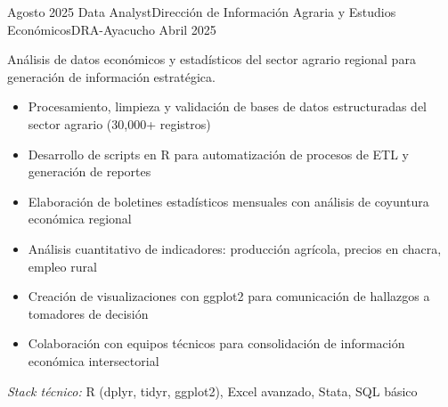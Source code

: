 \experience
{Agosto 2025} {Data Analyst}{Dirección de Información Agraria y Estudios Económicos}{DRA-Ayacucho}
{Abril 2025} {
	Análisis de datos económicos y estadísticos del sector agrario regional para generación de información estratégica.
	\begin{itemize}
		\item Procesamiento, limpieza y validación de bases de datos estructuradas del sector agrario (30,000+ registros)
		\item Desarrollo de scripts en R para automatización de procesos de ETL y generación de reportes
		\item Elaboración de boletines estadísticos mensuales con análisis de coyuntura económica regional
		\item Análisis cuantitativo de indicadores: producción agrícola, precios en chacra, empleo rural
		\item Creación de visualizaciones con ggplot2 para comunicación de hallazgos a tomadores de decisión
		\item Colaboración con equipos técnicos para consolidación de información económica intersectorial
	\end{itemize}
}
{\footnotesize{\emph{Stack técnico:} R (dplyr, tidyr, ggplot2), Excel avanzado, Stata, SQL básico}}
